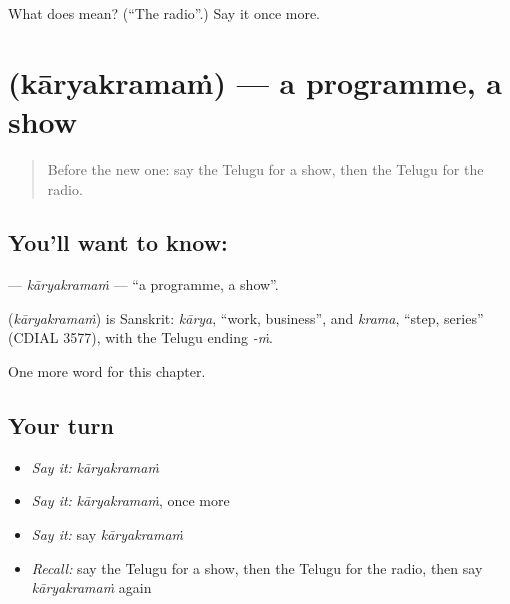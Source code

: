 \begin{tcolorbox}[breakable,colback=teal!4,colframe=teal!35!black,title={Before you move on}]
What does  mean? (\textquotedblleft{}The radio\textquotedblright{}.) Say it once more.
\end{tcolorbox}
\section[\texorpdfstring{\te{కార్యక్రమం} (kāryakramaṁ)}{కార్యక్రమం (kāryakramaṁ)}]{ (kāryakramaṁ) — a programme, a show}

\label{lesson:TE-C268-karyakramam}



\begin{quote}
Before the new one: say the Telugu for a show, then the Telugu for the radio.
\end{quote}

\subsection*{You'll want to know: }
\textbf{} — \emph{kāryakramaṁ} — \textquotedblleft{}a programme, a show\textquotedblright{}.

\begin{cousinweb}
\textbf{} (\emph{kāryakramaṁ}) is Sanskrit: \emph{kārya}, \textquotedblleft{}work, business\textquotedblright{}, and \emph{krama}, \textquotedblleft{}step, series\textquotedblright{} (CDIAL 3577), with the Telugu ending \emph{-ṁ}.
\end{cousinweb}

\begin{grammarlens}[title={What you've built}]
One more word for this chapter.
\end{grammarlens}

\subsection*{Your turn}
\begin{itemize}
\raggedright
  \item \emph{Say it:} \emph{kāryakramaṁ}
  \item \emph{Say it:} \emph{kāryakramaṁ}, once more
  \item \emph{Say it:} say \emph{kāryakramaṁ}
  \item \emph{Recall:} say the Telugu for a show, then the Telugu for the radio, then say \emph{kāryakramaṁ} again
\end{itemize}


